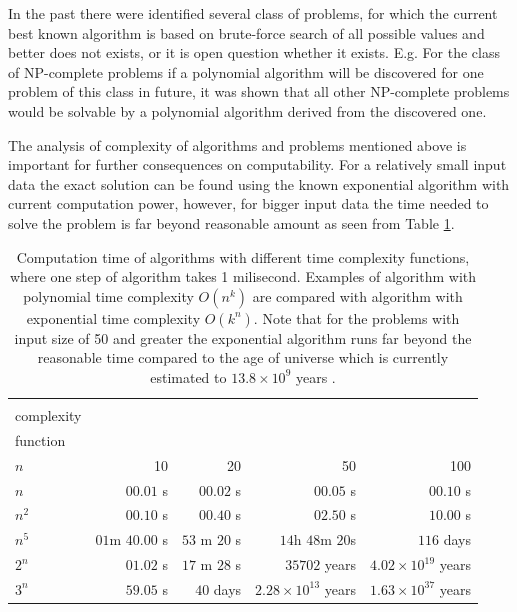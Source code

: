 In the past there were identified several class of problems, for which the current 
best known algorithm is based on brute-force search of all possible values and better does not exists, or it is open question whether it exists. E.g. For the class of {NP-complete} problems if a polynomial algorithm will be discovered for one problem of this class in future, it was shown that all other NP-complete problems would be solvable by a polynomial algorithm derived from the discovered one\cite{Cook1971,Karp1972}.

The analysis of complexity of algorithms and problems mentioned above is important for further consequences on computability.
For a relatively small input data the exact solution can be found using the known exponential algorithm with current computation power, however, for bigger input data the time needed to solve the problem is far beyond reasonable amount as seen from Table \ref{table:timecomplexity}.
\begin{table}[ht]
\footnotesize
\begin{tabular}{|l|r|r|r|r|}
\hline
\diagbox[height=43pt,width=125pt]{time\\complexity\\function}{input size \\ $n$} & 10          & 20        & 50             & 100            \\ \hline
$n$                                                                           & $00.01$ s     & $00.02$ s   & $00.05$ s        & $00.10$ s        \\ \hline
$n^2$                                                                         & $00.10$ s     & $00.40$ s   & $02.50$ s        & $10.00$ s        \\ \hline
$n^5$                                                                         & $01$m $40.00$ s & $53$ m $20$ s & $14$h $48$m $20$s    & $116$ days       \\ \hline
$2^n$                                                                         & $01.02$ s     & $17$ m $28$ s & $35702$ years    & $4.02\times 10^{19}$ years \\ \hline
$3^n$                                                                         & $59.05$ s     & $40$ days   & $2.28\times 10^{13}$ years & $1.63\times 10^{37}$ years \\ \hline
\end{tabular}
\caption{Computation time of algorithms with different time complexity functions, where one step of algorithm takes 1 milisecond. Examples of algorithm with polynomial time complexity $O(n^k)$ are compared with algorithm with exponential time complexity $O(k^n)$. Note that for the problems with input size of 50 and greater the exponential algorithm runs far beyond the reasonable time compared to the age of universe which is currently estimated to $13.8\times 10^9$  years \cite{PlanckCollaboration2013}.}
\label{table:timecomplexity}
\end{table}

